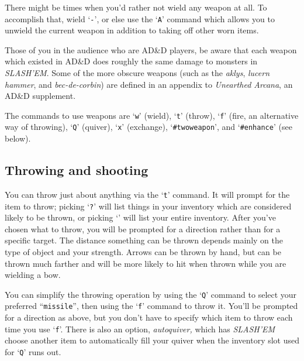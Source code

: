 There might be times when you'd rather not wield any weapon at all.
To accomplish that, wield `{\tt -}', or else use the `{\tt A}' command which
allows you to unwield the current weapon in addition to taking off
other worn items.

Those of you in the audience who are AD\&D players, be aware that each
weapon which existed in AD\&D does roughly the same damage to monsters in
{\it SLASH'EM}.  Some of the more obscure weapons (such as the {\it aklys},
{\it lucern hammer}, and {\it bec-de-corbin\/}) are defined in an
appendix to {\it Unearthed Arcana}, an AD\&D supplement.

The commands to use weapons are `{\tt w}' (wield), `{\tt t}' (throw),
`{\tt f}' (fire, an alternative way of throwing), `{\tt Q}' (quiver),
`{\tt x}' (exchange), `{\tt \#twoweapon}', and `{\tt \#enhance}' (see below).
\subsection*{Throwing and shooting}


You can throw just about anything via the `{\tt t}' command.  It will prompt
for the item to throw; picking `{\tt ?}' will list things in your inventory
which are considered likely to be thrown, or picking `{\tt *}' will list
your entire inventory.  After you've chosen what to throw, you will
be prompted for a direction rather than for a specific target.  The
distance something can be thrown depends mainly on the type of object
and your strength.  Arrows can be thrown by hand, but can be thrown
much farther and will be more likely to hit when thrown while you are
wielding a bow.

You can simplify the throwing operation by using the `{\tt Q}' command to
select your preferred ``{\tt missile}'', then using the `{\tt f}' command to
throw it.  You'll be prompted for a direction as above, but you don't
have to specify which item to throw each time you use `{\tt f}'.  There is
also an option,
{\it autoquiver,\/} 
which has {\it SLASH'EM\/} choose another item to automatically fill your
quiver when the inventory slot used for `{\tt Q}' runs out.

